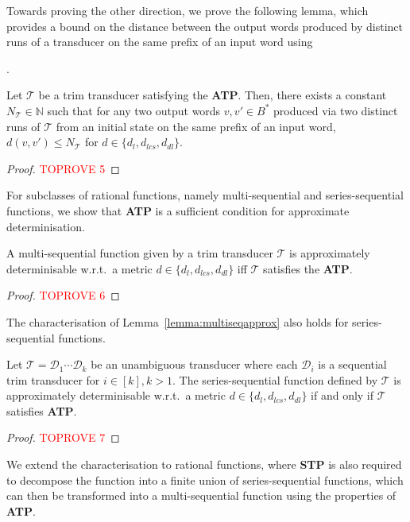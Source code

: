 \documentclass[a4paper,UKenglish,cleveref, autoref, thm-restate,authorcolumns, colorlinks]{lipics-v2021}
\newcommand\calD{\mathcal{D}}
\newcommand\calT{\mathcal{T}}
\newcommand{\ATP}[0]{\textbf{ATP}}
\newcommand{\STP}[0]{\textbf{STP}}
\begin{document}
Towards proving the other direction, we prove the following lemma, which provides a bound on the distance between the output words produced by distinct runs of a transducer on the same prefix of an input word using {. 


\begin{lemma}\label{lem:ATPtobound}
       Let $\calT$ be a trim transducer satisfying the \ATP{}. Then, there exists a constant $N_\calT \in \mathbb{N}$ such that for any two output words $v, v' \in B^*$ produced via two distinct runs of $\calT$ from an initial state on the same prefix of an input word, $d(v,v') \leq N_\calT$ for $d \in \{d_l,d_{lcs},d_{dl}\}$.
    \end{lemma}

    \begin{proof}\textcolor{red}{TOPROVE 5}\end{proof}

For subclasses of rational functions, namely multi-sequential and series-sequential functions, we show that \ATP{} is a sufficient condition for approximate determinisation. 
\begin{lemma} \label{lemma:multiseqapprox}
    A multi-sequential function given by a trim transducer $\calT$ is approximately determinisable w.r.t.~a metric $d \in \{d_l,d_{lcs},d_{dl}\}$ iff $\calT$ satisfies the \ATP{}.
\end{lemma}

\begin{proof}\textcolor{red}{TOPROVE 6}\end{proof}

The characterisation of Lemma~\ref{lemma:multiseqapprox} also holds for series-sequential functions.
\begin{lemma} \label{lemma:seriesseqapprox}
    Let $\calT = \calD_1 \cdots \calD_k$  be an unambiguous transducer where each $\calD_i$ is a sequential trim transducer for $i \in [k], k>1$. The series-sequential function defined by $\calT$ is approximately determinisable w.r.t.~a metric $d \in \{d_l,d_{lcs},d_{dl}\}$ if and only if $\calT$ satisfies \ATP{}.
\end{lemma}

\begin{proof}\textcolor{red}{TOPROVE 7}\end{proof}
We extend the characterisation to rational functions, where \STP{} is also required to decompose the function into a finite union of series-sequential functions, which can then be transformed into a multi-sequential function using the properties of \ATP{}. 

}
\end{document}
